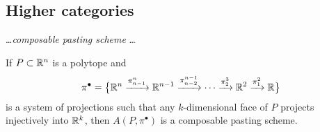 
\subsection{Higher categories}

\dots \textit{composable pasting scheme} \dots



\begin{proposition}
	If $P \subset \mathbb{R}^n$ is a polytope and
	\[
	\pi^\bullet = \big\{
	\mathbb{R}^n \xrightarrow{\pi^n_{n-1}} \mathbb{R}^{n-1} \xrightarrow{\pi^{n-1}_{n-2}} \dotsb \xrightarrow{\pi^3_{2}} \mathbb{R}^2 \xrightarrow{\pi^2_1} \mathbb{R}
	\big\}
	\]
	is a system of projections such that any $k$-dimensional
	face of $P$ projects injectively into $\mathbb{R}^k$, then $A(P, \pi^\bullet)$ is a composable pasting scheme.
\end{proposition}